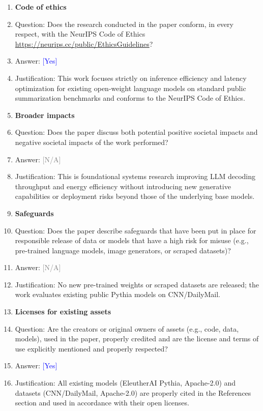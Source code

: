 \documentclass[10pt]{article}
\newcommand{\answerYes}[1][]{\textcolor{blue}{[Yes]} #1}
\newcommand{\answerNA}[1][]{\textcolor{gray}{[N/A]} #1}
\begin{document}
\begin{enumerate}
\item {\bf Code of ethics}
    \item[] Question: Does the research conducted in the paper conform, in every respect, with the NeurIPS Code of Ethics \url{https://neurips.cc/public/EthicsGuidelines}?
    \item[] Answer: \answerYes{}
    \item[] Justification: This work focuses strictly on inference efficiency and latency optimization for existing open-weight language models on standard public summarization benchmarks and conforms to the NeurIPS Code of Ethics.

\item {\bf Broader impacts}
    \item[] Question: Does the paper discuss both potential positive societal impacts and negative societal impacts of the work performed?
    \item[] Answer: \answerNA{}
    \item[] Justification: This is foundational systems research improving LLM decoding throughput and energy efficiency without introducing new generative capabilities or deployment risks beyond those of the underlying base models.

\item {\bf Safeguards}
    \item[] Question: Does the paper describe safeguards that have been put in place for responsible release of data or models that have a high risk for misuse (e.g., pre-trained language models, image generators, or scraped datasets)?
    \item[] Answer: \answerNA{}
    \item[] Justification: No new pre-trained weights or scraped datasets are released; the work evaluates existing public Pythia models on CNN/DailyMail.

\item {\bf Licenses for existing assets}
    \item[] Question: Are the creators or original owners of assets (e.g., code, data, models), used in the paper, properly credited and are the license and terms of use explicitly mentioned and properly respected?
    \item[] Answer: \answerYes{}
    \item[] Justification: All existing models (EleutherAI Pythia, Apache-2.0) and datasets (CNN/DailyMail, Apache-2.0) are properly cited in the References section and used in accordance with their open licenses.


\end{enumerate}
\end{document}
